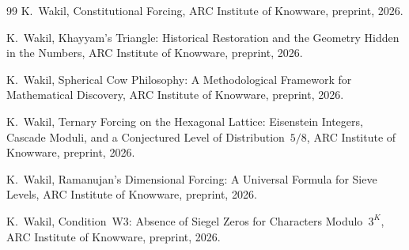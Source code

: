 \documentclass[12pt]{amsart}
\theoremstyle{plain}
\theoremstyle{definition}
\theoremstyle{remark}
\begin{document}
\begin{thebibliography}{99}
K.~Wakil,
Constitutional Forcing,
ARC Institute of Knowware, preprint, 2026.

K.~Wakil,
Khayyam's Triangle: Historical Restoration and the Geometry Hidden in the
Numbers,
ARC Institute of Knowware, preprint, 2026.

K.~Wakil,
Spherical Cow Philosophy: A Methodological Framework for Mathematical
Discovery,
ARC Institute of Knowware, preprint, 2026.

K.~Wakil,
Ternary Forcing on the Hexagonal Lattice: Eisenstein Integers, Cascade
Moduli, and a Conjectured Level of Distribution~$5/8$,
ARC Institute of Knowware, preprint, 2026.

K.~Wakil,
Ramanujan's Dimensional Forcing: A Universal Formula for Sieve Levels,
ARC Institute of Knowware, preprint, 2026.

K.~Wakil,
Condition~W3: Absence of Siegel Zeros for Characters Modulo~$3^K$,
ARC Institute of Knowware, preprint, 2026.

\end{thebibliography}
\end{document}
